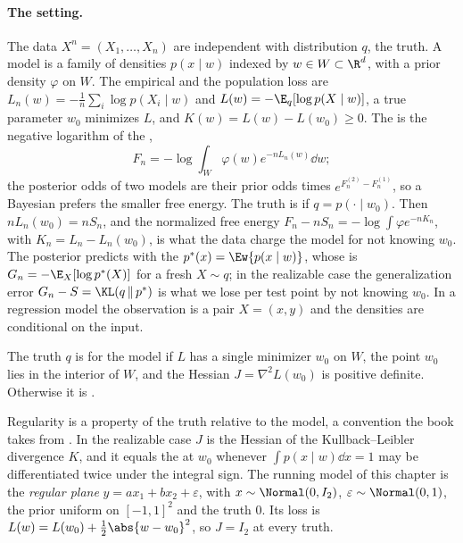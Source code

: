 \begin{refsection}
\paragraph{The setting.} The data $X^n=(X_1,\dots,X_n)$ are independent with distribution $q$, the truth. A model is a family of densities $p(x\mid w)$ indexed by $w\in W\subset\R^d$, with a prior density $\varphi$ on $W$. The empirical and the population loss are $L_n(w)=-\frac1n\sum_i\log p(X_i\mid w)$ and $L(w)=-\E_q[\log p(X\mid w)]$, a true parameter $w_0$ minimizes $L$, and $K(w)=L(w)-L(w_0)\ge0$. The  is the negative logarithm of the ,
\[
F_n=-\log\int_W\varphi(w)e^{-nL_n(w)}\dd w ;
\]
the posterior odds of two models are their prior odds times $e^{F_n^{(2)}-F_n^{(1)}}$, so a Bayesian prefers the smaller free energy. The truth is  if $q=p(\cdot\mid w_0)$. Then $nL_n(w_0)=nS_n$, and the normalized free energy $F_n-nS_n=-\log\int\varphi e^{-nK_n}$, with $K_n=L_n-L_n(w_0)$, is what the data charge the model for not knowing $w_0$. The posterior predicts with the  $p^*(x)=\Ew{p(x\mid w)}$, whose  is $G_n=-\E_X[\log p^*(X)]$ for a fresh $X\sim q$; in the realizable case the generalization error $G_n-S=\KL(q\,\|\,p^*)$ is what we lose per test point by not knowing $w_0$. In a regression model the observation is a pair $X=(x,y)$ and the densities are conditional on the input.

\begin{definition}\label{def:regular:regular}
The truth $q$ is  for the model if $L$ has a single minimizer $w_0$ on $W$, the point $w_0$ lies in the interior of $W$, and the Hessian $J=\nabla^2L(w_0)$ is positive definite. Otherwise it is .
\end{definition}

Regularity is a property of the truth relative to the model, a convention the book takes from \textcite{Watanabe2013}. In the realizable case $J$ is the Hessian of the Kullback--Leibler divergence $K$, and it equals the  at $w_0$ whenever $\int p(x\mid w)\dd x=1$ may be differentiated twice under the integral sign. The running model of this chapter is the \emph{regular plane} $y=ax_1+bx_2+\varepsilon$, with $x\sim\Normal(0,I_2)$, $\varepsilon\sim\Normal(0,1)$, the prior uniform on $[-1,1]^2$ and the truth $0$. Its loss is $L(w)=L(w_0)+\frac12\abs{w-w_0}^2$, so $J=I_2$ at every truth.


\end{refsection}

